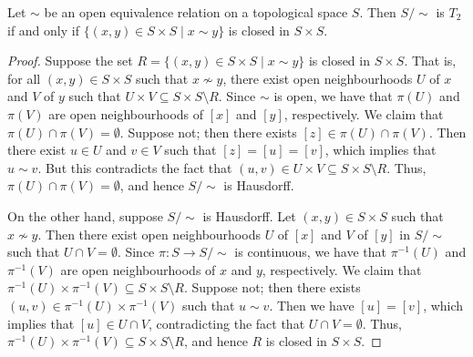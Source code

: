 \begin{proposition}
    Let $\sim$ be an open equivalence relation on a topological space $S$. Then $S/\!\sim$ is $T_{2}$ if and only if $\{(x,y) \in S \times S \mid x \sim y\}$ is closed in $S \times S$.
\end{proposition}

\begin{proof}
    Suppose the set $R = \{(x,y) \in S \times S \mid x \sim y\}$ is closed in $S \times S$. That is, for all $(x,y) \in S \times S$ such that $x \not\sim y$, there exist open neighbourhoods $U$ of $x$ and $V$ of $y$ such that $U \times V \subseteq S \times S \setminus R$. Since $\sim$ is open, we have that $\pi(U)$ and $\pi(V)$ are open neighbourhoods of $[x]$ and $[y]$, respectively. We claim that $\pi(U) \cap \pi(V) = \emptyset$. Suppose not; then there exists $[z] \in \pi(U) \cap \pi(V)$. Then there exist $u \in U$ and $v \in V$ such that $[z] = [u] = [v]$, which implies that $u \sim v$. But this contradicts the fact that $(u,v) \in U \times V \subseteq S \times S \setminus R$. Thus, $\pi(U) \cap \pi(V) = \emptyset$, and hence $S/\!\sim$ is Hausdorff.

    On the other hand, suppose $S/\!\sim$ is Hausdorff. Let $(x,y) \in S \times S$ such that $x \not\sim y$. Then there exist open neighbourhoods $U$ of $[x]$ and $V$ of $[y]$ in $S/\!\sim$ such that $U \cap V = \emptyset$. Since $\pi:S \to S/\!\sim$ is continuous, we have that $\pi^{-1}(U)$ and $\pi^{-1}(V)$ are open neighbourhoods of $x$ and $y$, respectively. We claim that $\pi^{-1}(U) \times \pi^{-1}(V) \subseteq S \times S \setminus R$. Suppose not; then there exists $(u,v) \in \pi^{-1}(U) \times \pi^{-1}(V)$ such that $u \sim v$. Then we have $[u] = [v]$, which implies that $[u] \in U \cap V$, contradicting the fact that $U \cap V = \emptyset$. Thus, $\pi^{-1}(U) \times \pi^{-1}(V) \subseteq S \times S \setminus R$, and hence $R$ is closed in $S \times S$.
\end{proof}


